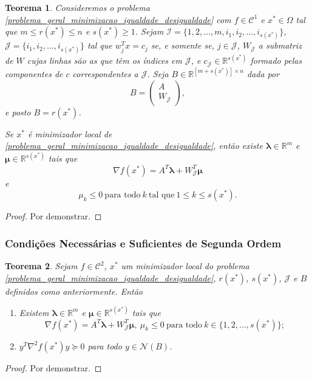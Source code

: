 \documentclass[12pt,a4paper]{scrartcl}
\def\RR{\mathds{R}}
\newtheorem{teo}{Teorema}
\theoremstyle{definition}%
\begin{document}
\begin{teo} \label{teo:condicao_necessaria_1ordem_igualdade_desigualdade}
Consideremos o problema \eqref{problema_geral_minimizacao_igualdade_desigualdade} com $f\in \mathcal{C}^{1}$ e $x^{*} \in \Omega$ tal que $m\leq r(x^{*}) \leq n$ e $s(x^{*}) \geq 1$. Sejam $\mathcal{I} = \{ 1,2, \ldots ,m, i_{1} , i_{2} , \ldots , i_{s(x^{*})} \}$, $\mathcal{J} = \{ i_{1} , i_{2} , \ldots , i_{s(x^{*})} \}$ tal que $w_{j}^{T}x = c_{j}$ se, e somente se, $j\in \mathcal{J}$, $W_{\mathcal{J}}$ a submatriz de $W$ cujas linhas são as que têm os índices em $\mathcal{J}$, e $c_{\mathcal{J}} \in \RR^{s(x^{*})}$ formado pelas componentes de $c$ correspondentes a $\mathcal{J}$. Seja $B \in \RR^{[m+s(x^{*})]\times n}$ dada por
\[
B = \left( \begin{array}{cc} A \\ W_{\mathcal{J}} \end{array} \right) ,
\]
e posto $B= r(x^{*})$.

Se $x^{*}$ é minimizador local de \eqref{problema_geral_minimizacao_igualdade_desigualdade}, então existe $\boldsymbol{\lambda} \in \RR^{m}$ e $\boldsymbol{\mu} \in \RR^{s(x^{*})}$ tais que
\[
\nabla f(x^{*}) = A^{T}\boldsymbol{\lambda} + W^{T}_{\mathcal{J}} \boldsymbol{\mu}
\]
e
\[
\mu_{k} \leq 0 \ \text{para todo} \ k \ \text{tal que} \ 1 \leq k \leq s(x^{*}).
\]
\end{teo}
\begin{proof}
Por demonstrar.
\end{proof}


\subsubsection{Condições Necessárias e Suficientes de Segunda Ordem}


\begin{teo} \label{teo:condicao_necessaria_2ordem_igualdade_desigualdade}
Sejam $f \in \mathcal{C}^{2}$, $x^{*}$ um minimizador local do problema \eqref{problema_geral_minimizacao_igualdade_desigualdade}, $r(x^{*})$, $s(x^{*})$, $\mathcal{J}$ e $B$ definidos como anteriormente. Então
\begin{enumerate}
	\item[(i)] Existem $\boldsymbol{\lambda} \in \RR^{m}$ e $\boldsymbol{\mu} \in \RR^{s(x^{*})}$ tais que 
	\[
	\nabla f(x^{*}) = A^{T}\boldsymbol{\lambda} + W^{T}_{\mathcal{J}} \boldsymbol{\mu}, \ \mu_{k} \leq 0 \ \text{para todo} \ k\in \{ 1,2, \ldots , s(x^{*}) \} ;
	\]
	\item[(ii)] $y^{T}\nabla^{2} f(x^{*})y \succcurlyeq 0$ para todo $y\in \mathcal{N}(B)$.
\end{enumerate}	
\end{teo}
\begin{proof}
Por demonstrar.
\end{proof}
\end{document}

